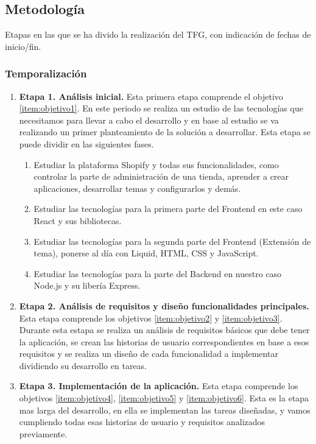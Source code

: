 \documentclass[12pt]{article}
\begin{document}
\subsection{Metodología}
Etapas en las que se ha divido la realización del TFG, con indicación de fechas de inicio/fin.

\subsubsection{Temporalización}

\begin{enumerate}[label={\textbf{\textbullet}}]
    \item \textbf{Etapa 1. Análisis inicial.} Esta primera etapa comprende el objetivo \ref{item:objetivo1}. En este periodo se realiza un estudio de las tecnologías
    que necesitamos para llevar a cabo el desarrollo y en base al estudio se va realizando un primer planteamiento de la solución a desarrollar. Esta etapa se puede dividir en las siguientes fases.
    \begin{enumerate}
        \item Estudiar la plataforma Shopify y todas sus funcionalidades, como controlar la parte de administración de una tienda, aprender a crear aplicaciones, desarrollar temas y configurarlos y demás.
        \item Estudiar las tecnologías para la primera parte del Frontend en este caso React y sus bibliotecas.
        \item Estudiar las tecnologías para la segunda parte del Frontend (Extensión de tema), ponerse al día con Liquid, HTML, CSS y JavaScript.
        \item Estudiar las tecnologías para la parte del Backend en nuestro caso Node.js y su libería Express. 
    \end{enumerate}
    \item \textbf{Etapa 2. Análisis de requisitos y diseño funcionalidades principales.} Esta etapa comprende los objetivos \ref{item:objetivo2} y \ref{item:objetivo3}.
    Durante esta estapa se realiza un análisis de requisitos básicos que debe tener la aplicación, se crean las historias de usuario correspondientes en base a esos requisitos y se realiza un diseño de cada
    funcionalidad a implementar dividiendo su desarrollo en tareas.
    \item \textbf{Etapa 3. Implementación de la aplicación.} Esta etapa comprende los objetivos \ref{item:objetivo4}, \ref{item:objetivo5} y \ref{item:objetivo6}.
    Esta es la etapa mas larga del desarrollo, en ella se implementan las tareas diseñadas, y vamos cumpliendo todas esas historias de usuario y requisitos analizados previamente.

\end{enumerate}
\end{document}
